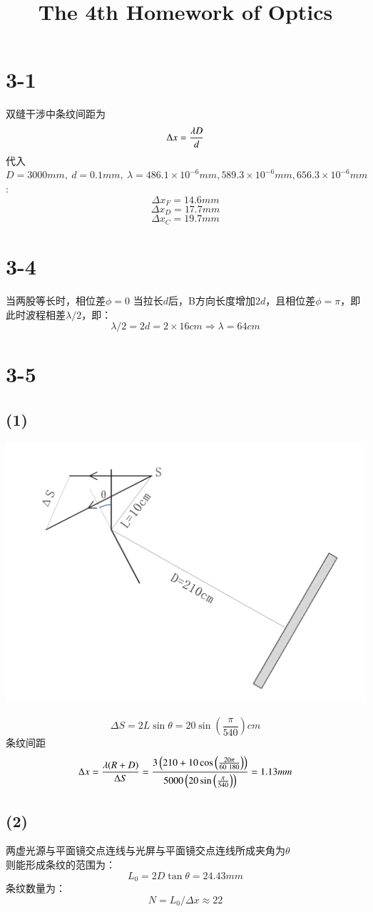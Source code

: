 \documentclass[UTF8,9pt]{ctexart}
\title{The 4th Homework of Optics}
\begin{document}
\maketitle
\section{3-1}
双缝干涉中条纹间距为
$$\Delta x=\frac{\lambda D}{d}$$
代入$D=3000mm,\ d=0.1mm,\ \lambda=486.1\times10^{-6}mm,589.3\times10^{-6}mm,656.3\times10^{-6}mm$:
$$\Delta x_F=14.6mm$$
$$\Delta x_D=17.7mm$$
$$\Delta x_C=19.7mm$$
\section{3-4}
当两股等长时，相位差$\phi=0$
当拉长$d$后，B方向长度增加$2d$，且相位差$\phi=\pi$，即此时波程相差$\lambda/2$，即：
$$\lambda/2=2d=2\times 16cm \Rightarrow \lambda=64cm$$
\section{3-5}
\subsection{(1)}
\begin{center}
	\includegraphics[scale=0.1]{1.png}\\
\end{center}
$$\Delta S=2L\sin\theta=20 \sin \left(\frac{\pi }{540}\right)cm$$
条纹间距
$$\Delta x=\f{\lambda (R+D)}{\Delta S}=\frac{3 \left(210+10 \cos \left(\frac{20 \pi }{60\ 180}\right)\right)}{5000 \left(20 \sin \left(\frac{\pi }{540}\right)\right)}=1.13mm$$
\subsection{(2)}
两虚光源与平面镜交点连线与光屏与平面镜交点连线所成夹角为$\theta$\\
则能形成条纹的范围为：
$$L_0=2D\tan\theta=24.43mm$$
条纹数量为：
$$N=L_0/\Delta x\approx 22$$
\end{document}
